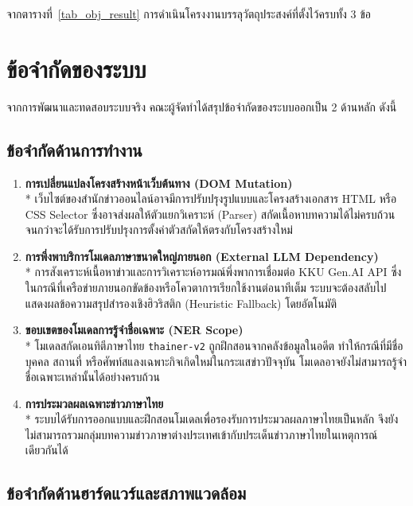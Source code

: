 จากตารางที่~\ref{tab_obj_result} การดำเนินโครงงานบรรลุวัตถุประสงค์ที่ตั้งไว้ครบทั้ง 3 ข้อ

\section{ข้อจำกัดของระบบ}

จากการพัฒนาและทดสอบระบบจริง คณะผู้จัดทำได้สรุปข้อจำกัดของระบบออกเป็น 2 ด้านหลัก ดังนี้

\subsection{ข้อจำกัดด้านการทำงาน}

\begin{enumerate}
    \item \textbf{การเปลี่ยนแปลงโครงสร้างหน้าเว็บต้นทาง (DOM Mutation)}\\*
    เว็บไซต์ของสำนักข่าวออนไลน์อาจมีการปรับปรุงรูปแบบและโครงสร้างเอกสาร HTML หรือ CSS Selector ซึ่งอาจส่งผลให้ตัวแยกวิเคราะห์ (Parser) สกัดเนื้อหาบทความได้ไม่ครบถ้วน จนกว่าจะได้รับการปรับปรุงการตั้งค่าตัวสกัดให้ตรงกับโครงสร้างใหม่
    \item \textbf{การพึ่งพาบริการโมเดลภาษาขนาดใหญ่ภายนอก (External LLM Dependency)}\\*
    การสังเคราะห์เนื้อหาข่าวและการวิเคราะห์อารมณ์พึ่งพาการเชื่อมต่อ KKU Gen.AI API ซึ่งในกรณีที่เครือข่ายภายนอกขัดข้องหรือโควตาการเรียกใช้งานต่อนาทีเต็ม ระบบจะต้องสลับไปแสดงผลข้อความสรุปสำรองเชิงฮิวริสติก (Heuristic Fallback) โดยอัตโนมัติ
    \item \textbf{ขอบเขตของโมเดลการรู้จำชื่อเฉพาะ (NER Scope)}\\*
    โมเดลสกัดเอนทิตีภาษาไทย \texttt{thainer-v2} ถูกฝึกสอนจากคลังข้อมูลในอดีต ทำให้กรณีที่มีชื่อบุคคล สถานที่ หรือศัพท์สแลงเฉพาะกิจเกิดใหม่ในกระแสข่าวปัจจุบัน โมเดลอาจยังไม่สามารถรู้จำชื่อเฉพาะเหล่านั้นได้อย่างครบถ้วน
    \item \textbf{การประมวลผลเฉพาะข่าวภาษาไทย}\\*
    ระบบได้รับการออกแบบและฝึกสอนโมเดลเพื่อรองรับการประมวลผลภาษาไทยเป็นหลัก จึงยังไม่สามารถรวมกลุ่มบทความข่าวภาษาต่างประเทศเข้ากับประเด็นข่าวภาษาไทยในเหตุการณ์เดียวกันได้
\end{enumerate}

\subsection{ข้อจำกัดด้านฮาร์ดแวร์และสภาพแวดล้อม}

